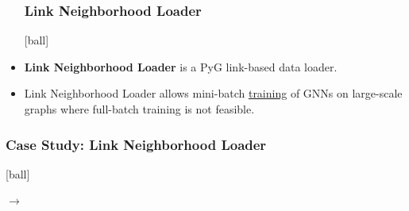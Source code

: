 \documentclass{beamer}
\begin{document}
\begin{frame}[fragile]
\begin{itemize}
\frametitle{Link Neighborhood Loader}
[ball]

\item \textbf{Link Neighborhood Loader} is a PyG link-based data loader. 



\vspace{0.4cm}

\item Link Neighborhood Loader allows mini-batch \underline{training} of GNNs on large-scale graphs where full-batch training is not feasible.



\end{itemize}
\end{frame}


\begin{frame}[fragile]
\frametitle{Case Study: Link Neighborhood Loader}
[ball]

\vspace{1cm}
\begin{minipage}[c]{1.2\textwidth}

\end{minipage}

\vspace{-2cm}
\begin{minipage}[c]{1.2\textwidth}
    \hspace{7cm}
    $\to$
\end{minipage}

\vspace{-2.2cm}
\begin{minipage}[c]{1.2\textwidth}
\hspace{8cm}

\end{minipage}

\end{frame}

\end{document}
